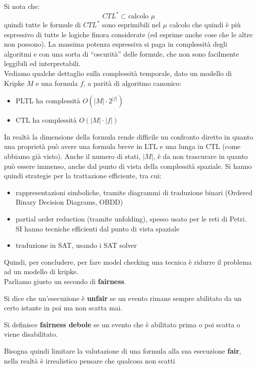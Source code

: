 Si nota che:
\[CTL^*\subset \mbox{calcolo } \mu\]
quindi tutte le formule di $CTL^*$ sono esprimibili nel $\mu$ calcolo che quindi
è più espressivo di tutte le logiche finora considerate (ed esprime anche cose
che le altre non possono). La massima potenza espressiva si paga in complessità
degli algoritmi e con una sorta di ``oscurità'' delle formule, che non sono
facilmente leggibili ed interpretabili.\\
Vediamo qualche dettaglio sulla complessità temporale, dato un modello di
Kripke $M$ e una formula $f$, a parità di algoritmo canonico:
\begin{itemize}
  \item PLTL ha complessità $O(|M|\cdot 2^{|f|})$
  \item CTL ha complessità $O(|M|\cdot |f|)$
\end{itemize}
In realtà la dimensione della formula rende difficile un confronto diretto in
quanto una proprietà può avere una formula breve in LTL e una lunga in CTL (come
abbiamo già visto). Anche il numero di stati, $|M|$, è da non trascurare in
quanto può essere immenso, anche dal punto di vista della complessità
spaziale. Si hanno quindi strategie per la trattazione 
efficiente, tra cui:
\begin{itemize}
  \item rappresentazioni simboliche, tramite diagrammi di traduzione
  binari (Ordered Binary Decision Diagrams, OBDD)
  \item partial order reduction (tramite unfolding), spesso usato per le
  reti di Petri. SI hanno tecniche efficienti dal punto di vista spaziale
  \item traduzione in SAT, usando i SAT solver
\end{itemize}
Quindi, per concludere, per fare model checking una tecnica è ridurre il
problema ad un modello di kripke.\\
Parliamo giusto un secondo di \textbf{fairness}.
\begin{definizione}
  Si dice che un'esecuzione è \textbf{unfair} se un evento rimane sempre
  abilitato da un certo istante in poi ma non scatta mai.\\
\end{definizione}
\begin{definizione}
  Si definisce \textbf{fairness debole} se un evento che è abilitato
  prima o poi scatta o viene disabilitato.
\end{definizione}
Bisogna quindi limitare la valutazione di una formula alla sua esecuzione
\textbf{fair}, nella realtà è irrealistico pensare che qualcosa non scatti
